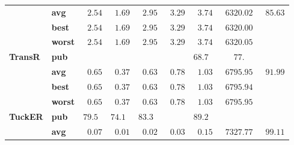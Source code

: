 \begin{tabular}{llrrrrrrr}
       & \textbf{avg} &  $\phantom{0}2.54$ &  $\phantom{0}1.69$ &  $\phantom{0}2.95$ &  $\phantom{0}3.29$ &  $\phantom{0}3.74$ &            $\phantom{0}6320.02$ &  $\phantom{0}85.63$ \\
       & \textbf{best} &  $\phantom{0}2.54$ &  $\phantom{0}1.69$ &  $\phantom{0}2.95$ &  $\phantom{0}3.29$ &  $\phantom{0}3.74$ &            $\phantom{0}6320.00$ &                     \\
       & \textbf{worst} &  $\phantom{0}2.54$ &  $\phantom{0}1.69$ &  $\phantom{0}2.95$ &  $\phantom{0}3.29$ &  $\phantom{0}3.74$ &            $\phantom{0}6320.05$ &                     \\
\textbf{TransR} & \textbf{pub} &                    &                    &                    &                    &  $68.7\phantom{0}$ &  $\phantom{000}77.\phantom{00}$ &                     \\
       & \textbf{avg} &  $\phantom{0}0.65$ &  $\phantom{0}0.37$ &  $\phantom{0}0.63$ &  $\phantom{0}0.78$ &  $\phantom{0}1.03$ &            $\phantom{0}6795.95$ &  $\phantom{0}91.99$ \\
       & \textbf{best} &  $\phantom{0}0.65$ &  $\phantom{0}0.37$ &  $\phantom{0}0.63$ &  $\phantom{0}0.78$ &  $\phantom{0}1.03$ &            $\phantom{0}6795.94$ &                     \\
       & \textbf{worst} &  $\phantom{0}0.65$ &  $\phantom{0}0.37$ &  $\phantom{0}0.63$ &  $\phantom{0}0.78$ &  $\phantom{0}1.03$ &            $\phantom{0}6795.95$ &                     \\
\textbf{TuckER} & \textbf{pub} &  $79.5\phantom{0}$ &  $74.1\phantom{0}$ &  $83.3\phantom{0}$ &                    &  $89.2\phantom{0}$ &                                 &                     \\
       & \textbf{avg} &  $\phantom{0}0.07$ &  $\phantom{0}0.01$ &  $\phantom{0}0.02$ &  $\phantom{0}0.03$ &  $\phantom{0}0.15$ &            $\phantom{0}7327.77$ &  $\phantom{0}99.11$ \\
\bottomrule
\end{tabular}

